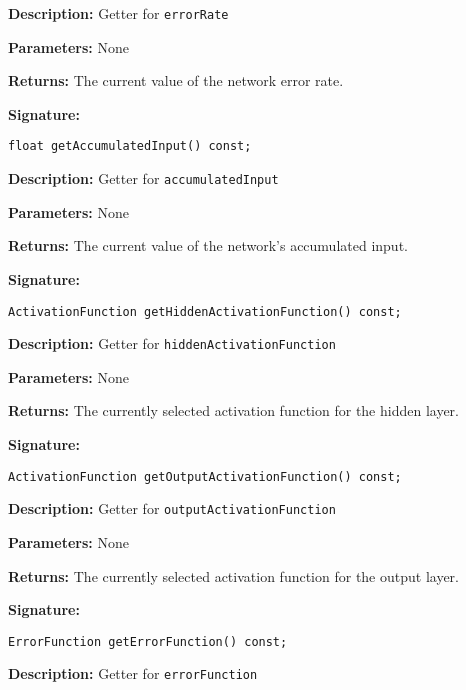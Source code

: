 \documentclass[a4paper]{article}
\begin{document}
\textbf{Description: }
Getter for \lstinline{errorRate}

\textbf{Parameters: } None

\textbf{Returns: }
The current value of the network error rate.

\hrulefill %

\textbf{Signature:} \begin{lstlisting}
float getAccumulatedInput() const;
\end{lstlisting}

\textbf{Description: }
Getter for \lstinline{accumulatedInput}

\textbf{Parameters: } None

\textbf{Returns: }
The current value of the network's accumulated input.

\hrulefill %

\textbf{Signature:} \begin{lstlisting}
ActivationFunction getHiddenActivationFunction() const;
\end{lstlisting}

\textbf{Description: }
Getter for \lstinline{hiddenActivationFunction}

\textbf{Parameters: } None

\textbf{Returns: }
The currently selected activation function for the hidden layer.

\hrulefill %

\textbf{Signature:} \begin{lstlisting}
ActivationFunction getOutputActivationFunction() const;
\end{lstlisting}

\textbf{Description: }
Getter for \lstinline{outputActivationFunction}

\textbf{Parameters: } None

\textbf{Returns: }
The currently selected activation function for the output layer.

\hrulefill %

\textbf{Signature:} \begin{lstlisting}
ErrorFunction getErrorFunction() const;
\end{lstlisting}

\textbf{Description: }
Getter for \lstinline{errorFunction}
\end{document}
